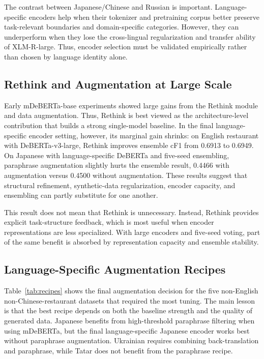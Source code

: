 \documentclass[runningheads]{llncs}
\begin{document}
The contrast between Japanese/Chinese and Russian is important.
Language-specific encoders help when their tokenizer and pretraining
corpus better preserve task-relevant boundaries and domain-specific
categories. However, they can underperform when they lose the
cross-lingual regularization and transfer ability of XLM-R-large. Thus,
encoder selection must be validated empirically rather than chosen by
language identity alone.

\subsection{Rethink and Augmentation at Large Scale}

Early mDeBERTa-base experiments showed large gains from the Rethink
module and data augmentation. Thus, Rethink is best viewed as the
architecture-level contribution that builds a strong single-model
baseline. In the final language-specific encoder setting, however, its marginal gain shrinks:
on English restaurant with DeBERTa-v3-large, Rethink improves ensemble
cF1 from 0.6913 to 0.6949. On Japanese with language-specific DeBERTa and
five-seed ensembling, paraphrase augmentation slightly hurts the
ensemble result, 0.4466 with augmentation versus 0.4500 without
augmentation. These results suggest that structural refinement,
synthetic-data regularization, encoder capacity, and ensembling can
partly substitute for one another.

This result does not mean that Rethink is unnecessary. Instead, Rethink
provides explicit task-structure feedback, which is most useful when
encoder representations are less specialized. With large encoders and
five-seed voting, part of the same benefit is absorbed by representation
capacity and ensemble stability.

\subsection{Language-Specific Augmentation Recipes}

Table~\ref{tab:recipes} shows the final augmentation decision for the
five non-English non-Chinese-restaurant datasets that required the
most tuning. The main lesson is that the best recipe depends on both
the baseline strength and the quality of generated data. Japanese
benefits from high-threshold paraphrase filtering when using mDeBERTa,
but the final language-specific Japanese encoder works best without paraphrase
augmentation. Ukrainian requires combining back-translation and
paraphrase, while Tatar does not benefit from the paraphrase recipe.
\end{document}
